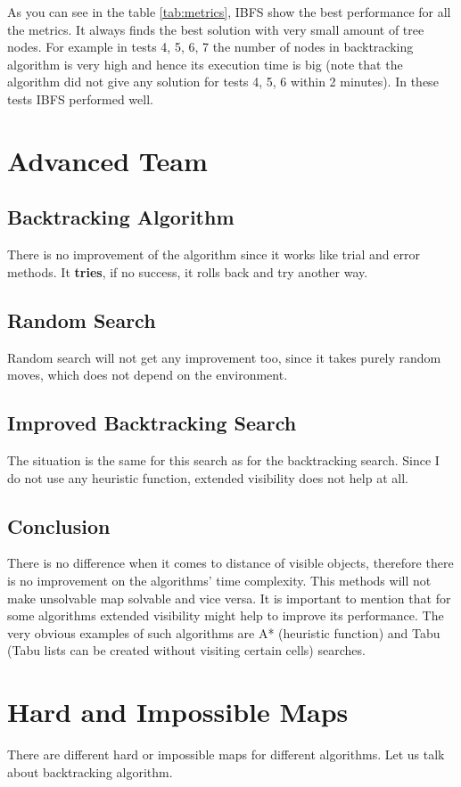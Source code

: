 \documentclass{article}
\begin{document}
As you can see in the table \ref{tab:metrics}, IBFS show the best performance for all the metrics. It always finds the best solution with very small amount of tree nodes. For example in tests 4, 5, 6, 7 the number of nodes in backtracking algorithm is very high and hence its execution time is big (note that the algorithm did not give any solution for tests 4, 5, 6 within 2 minutes). In these tests IBFS performed well.

\section{Advanced Team}
\subsection{Backtracking Algorithm}
There is no improvement of the algorithm since it works like trial and error methods. It \textbf{tries}, if no success, it rolls back and try another way. 
\subsection{Random Search}
Random search will not get any improvement too, since it takes purely random moves, which does not depend on the environment.
\subsection{Improved Backtracking Search}
The situation is the same for this search as for the backtracking search. Since I do not use any heuristic function, extended visibility does not help at all.
\subsection{Conclusion}
There is no difference when it comes to distance of visible objects, therefore there is no improvement on the algorithms' time complexity. This methods will not make unsolvable map solvable and vice versa.
It is important to mention that for some algorithms extended visibility might help to improve its performance. The very obvious examples of such algorithms are A* (heuristic function) and Tabu (Tabu lists can be created without visiting certain cells) searches.

\section{Hard and Impossible Maps}
\label{section:impossible-maps}
There are different hard or impossible maps for different algorithms. 
Let us talk about backtracking algorithm.
\end{document}
